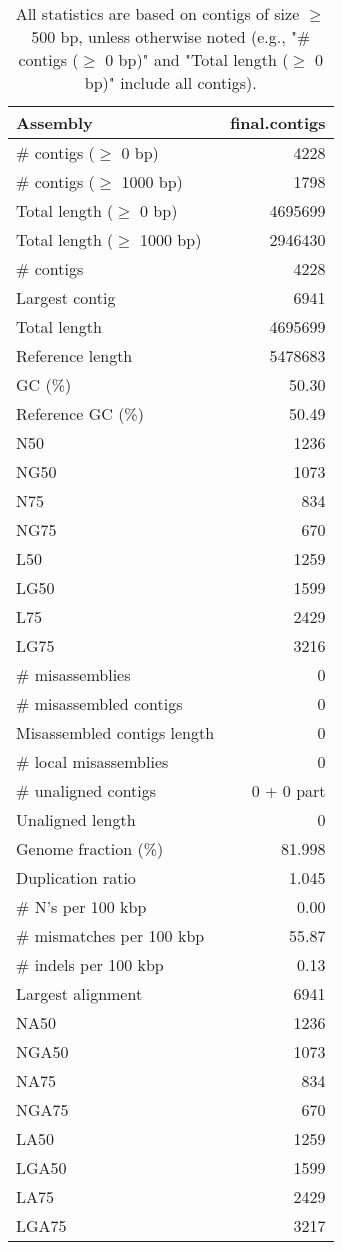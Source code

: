\documentclass[12pt,a4paper]{article}
\begin{document}
\begin{table}[ht]
\begin{center}
\caption{All statistics are based on contigs of size $\geq$ 500 bp, unless otherwise noted (e.g., "\# contigs ($\geq$ 0 bp)" and "Total length ($\geq$ 0 bp)" include all contigs).}
\begin{tabular}{|l*{1}{|r}|}
\hline
Assembly & final.contigs \\ \hline
\# contigs ($\geq$ 0 bp) & 4228 \\ \hline
\# contigs ($\geq$ 1000 bp) & 1798 \\ \hline
Total length ($\geq$ 0 bp) & 4695699 \\ \hline
Total length ($\geq$ 1000 bp) & 2946430 \\ \hline
\# contigs & 4228 \\ \hline
Largest contig & 6941 \\ \hline
Total length & 4695699 \\ \hline
Reference length & 5478683 \\ \hline
GC (\%) & 50.30 \\ \hline
Reference GC (\%) & 50.49 \\ \hline
N50 & 1236 \\ \hline
NG50 & 1073 \\ \hline
N75 & 834 \\ \hline
NG75 & 670 \\ \hline
L50 & 1259 \\ \hline
LG50 & 1599 \\ \hline
L75 & 2429 \\ \hline
LG75 & 3216 \\ \hline
\# misassemblies & 0 \\ \hline
\# misassembled contigs & 0 \\ \hline
Misassembled contigs length & 0 \\ \hline
\# local misassemblies & 0 \\ \hline
\# unaligned contigs & 0 + 0 part \\ \hline
Unaligned length & 0 \\ \hline
Genome fraction (\%) & 81.998 \\ \hline
Duplication ratio & 1.045 \\ \hline
\# N's per 100 kbp & 0.00 \\ \hline
\# mismatches per 100 kbp & 55.87 \\ \hline
\# indels per 100 kbp & 0.13 \\ \hline
Largest alignment & 6941 \\ \hline
NA50 & 1236 \\ \hline
NGA50 & 1073 \\ \hline
NA75 & 834 \\ \hline
NGA75 & 670 \\ \hline
LA50 & 1259 \\ \hline
LGA50 & 1599 \\ \hline
LA75 & 2429 \\ \hline
LGA75 & 3217 \\ \hline
\end{tabular}
\end{center}
\end{table}
\end{document}
